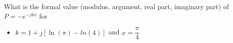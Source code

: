 \bexo 

What is the formal value (modulus, argument, real part, imaginary part) of $P=-e^{-jkx}$ for 
\begin{itemize}
\item $k=1+j[\ln(\pi)-ln(4)]$ and $x=\dfrac{\pi}{4}$
\end{itemize}



\eexo

\solution{
\more
}